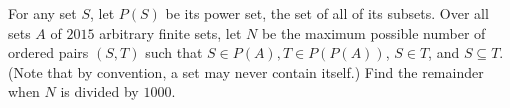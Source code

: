 For any set $S$, let $P(S)$ be its power set, the set of all of its subsets. Over all sets $A$ of $2015$ arbitrary finite sets, let $N$ be the maximum possible number of ordered pairs $(S,T)$ such that $S \in P(A), T \in P(P(A))$, $S \in T$, and $S \subseteq T$. (Note that by convention, a set may never contain itself.) Find the remainder when $N$ is divided by $1000.$
